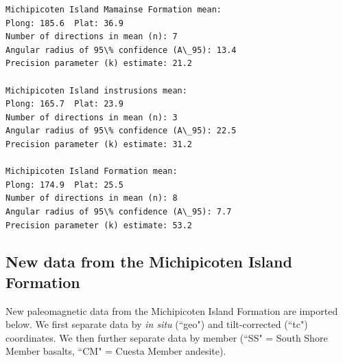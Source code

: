 \documentclass{article}
\begin{document}
    \begin{Verbatim}[commandchars=\\\{\}]
Michipicoten Island Mamainse Formation mean:
Plong: 185.6  Plat: 36.9
Number of directions in mean (n): 7
Angular radius of 95\% confidence (A\_95): 13.4
Precision parameter (k) estimate: 21.2

Michipicoten Island instrusions mean:
Plong: 165.7  Plat: 23.9
Number of directions in mean (n): 3
Angular radius of 95\% confidence (A\_95): 22.5
Precision parameter (k) estimate: 31.2

Michipicoten Island Formation mean:
Plong: 174.9  Plat: 25.5
Number of directions in mean (n): 8
Angular radius of 95\% confidence (A\_95): 7.7
Precision parameter (k) estimate: 53.2
    \end{Verbatim}

    \begin{center}
    \end{center}
        
\subsection{New data from the Michipicoten Island
Formation}\label{new-data-from-the-michipicoten-island-formation}

    New paleomagnetic data from the Michipicoten Island Formation are
imported below. We first separate data by \textit{in situ} (``geo") and
tilt-corrected (``tc") coordinates. We then further separate data by
member (``SS" = South Shore Member basalts, ``CM" = Cuesta Member
andesite).
\end{document}

